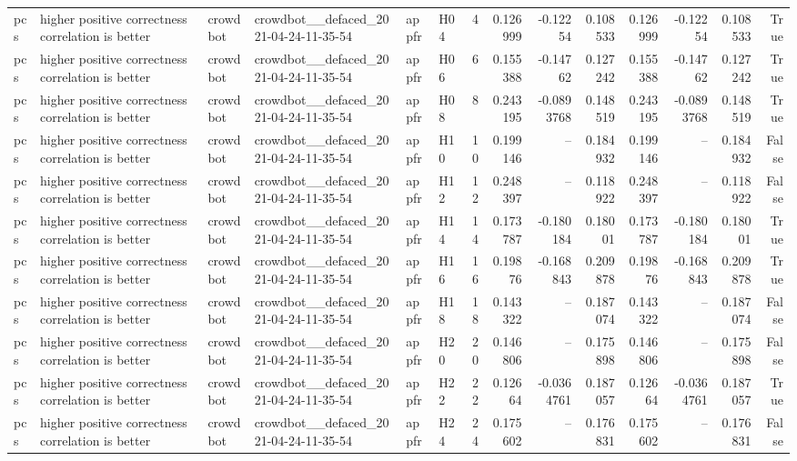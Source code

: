\begin{longtable}{llllllrrrrrrrr}
pcs & higher positive correctness correlation is better & crowdbot & crowdbot\_\_defaced\_2021-04-24-11-35-54 & appfr & H04 & 4 & 0.126999 & -0.12254 & 0.108533 & 0.126999 & -0.12254 & 0.108533 & True \\
pcs & higher positive correctness correlation is better & crowdbot & crowdbot\_\_defaced\_2021-04-24-11-35-54 & appfr & H06 & 6 & 0.155388 & -0.14762 & 0.127242 & 0.155388 & -0.14762 & 0.127242 & True \\
pcs & higher positive correctness correlation is better & crowdbot & crowdbot\_\_defaced\_2021-04-24-11-35-54 & appfr & H08 & 8 & 0.243195 & -0.0893768 & 0.148519 & 0.243195 & -0.0893768 & 0.148519 & True \\
pcs & higher positive correctness correlation is better & crowdbot & crowdbot\_\_defaced\_2021-04-24-11-35-54 & appfr & H10 & 10 & 0.199146 & -- & 0.184932 & 0.199146 & -- & 0.184932 & False \\
pcs & higher positive correctness correlation is better & crowdbot & crowdbot\_\_defaced\_2021-04-24-11-35-54 & appfr & H12 & 12 & 0.248397 & -- & 0.118922 & 0.248397 & -- & 0.118922 & False \\
pcs & higher positive correctness correlation is better & crowdbot & crowdbot\_\_defaced\_2021-04-24-11-35-54 & appfr & H14 & 14 & 0.173787 & -0.180184 & 0.18001 & 0.173787 & -0.180184 & 0.18001 & True \\
pcs & higher positive correctness correlation is better & crowdbot & crowdbot\_\_defaced\_2021-04-24-11-35-54 & appfr & H16 & 16 & 0.19876 & -0.168843 & 0.209878 & 0.19876 & -0.168843 & 0.209878 & True \\
pcs & higher positive correctness correlation is better & crowdbot & crowdbot\_\_defaced\_2021-04-24-11-35-54 & appfr & H18 & 18 & 0.143322 & -- & 0.187074 & 0.143322 & -- & 0.187074 & False \\
pcs & higher positive correctness correlation is better & crowdbot & crowdbot\_\_defaced\_2021-04-24-11-35-54 & appfr & H20 & 20 & 0.146806 & -- & 0.175898 & 0.146806 & -- & 0.175898 & False \\
pcs & higher positive correctness correlation is better & crowdbot & crowdbot\_\_defaced\_2021-04-24-11-35-54 & appfr & H22 & 22 & 0.12664 & -0.0364761 & 0.187057 & 0.12664 & -0.0364761 & 0.187057 & True \\
pcs & higher positive correctness correlation is better & crowdbot & crowdbot\_\_defaced\_2021-04-24-11-35-54 & appfr & H24 & 24 & 0.175602 & -- & 0.176831 & 0.175602 & -- & 0.176831 & False \\

\end{longtable}
